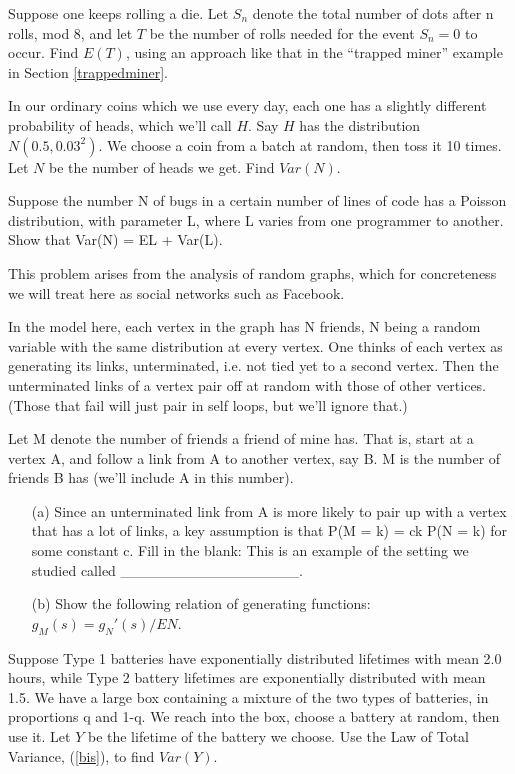 \oneproblem 
Suppose one keeps rolling a die. Let $S_n$ denote the total
number of dots after n rolls, mod 8, and let $T$ be the number of rolls
needed for the event $S_n = 0$ to occur. Find $E(T)$, using an approach
like that in the ``trapped miner'' example in Section
\ref{trappedminer}.

\oneproblem
In our ordinary coins which we use every day, each one has a slightly 
different probability of heads, which we'll call $H$.  Say $H$ has 
the distribution $N(0.5, 0.03^2)$.  We choose a coin from a batch at 
random, then toss it 10 times.  Let $N$ be the number of heads we get.  
Find $Var(N)$.

\oneproblem
Suppose the number N of bugs in a certain number of lines of code has a
Poisson distribution, with parameter L, where L varies from one
programmer to another. Show that Var(N) = EL + Var(L).

\oneproblem
This problem arises from the analysis of random graphs, which for
concreteness we will treat here as social networks such as Facebook.

In the model here, each vertex in the graph has N friends, N being a
random variable with the same distribution at every vertex. One thinks
of each vertex as generating its links, unterminated, i.e. not tied yet
to a second vertex. Then the unterminated links of a vertex pair off at
random with those of other vertices. (Those that fail will just pair in
self loops, but we'll ignore that.)

Let M denote the number of friends a friend of mine has. That is, start
at a vertex A, and follow a link from A to another vertex, say B. M is
the number of friends B has (we'll include A in this number).

\begin{itemize}

\item [(a)] Since an unterminated link from A is more likely to pair up
with a vertex that has a lot of links, a key assumption is that P(M = k)
= ck P(N = k) for some constant c. Fill in the blank: This is an example
of the setting we studied called \_\_\_\_\_\_\_\_\_\_\_\_\_\_\_\_\_.

\item [(b)] Show the following relation of generating functions: $g_M(s)
= g_N'(s)/EN$. 

\end{itemize}

\oneproblem
Suppose Type 1 batteries have exponentially distributed lifetimes with
mean 2.0 hours, while Type 2 battery lifetimes are exponentially
distributed with mean 1.5.  We have a large box containing a mixture of
the two types of batteries, in proportions q and 1-q.  We reach into the
box, choose a battery at random, then use it.  Let $Y$ be the lifetime
of the battery we choose.  Use the Law of Total Variance, (\ref{bis}),
to find $Var(Y)$.


